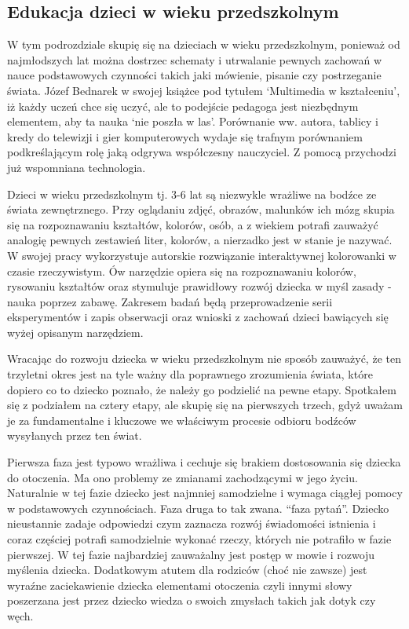 \documentclass{article}
\begin{document}
\subsection{Edukacja dzieci w wieku przedszkolnym}

\par
W tym podrozdziale skupię się na dzieciach w wieku przedszkolnym, ponieważ od najmłodszych lat można dostrzec schematy i utrwalanie pewnych zachowań w nauce podstawowych czynności takich jaki mówienie, pisanie czy postrzeganie świata. Józef Bednarek w swojej książce pod tytułem ‘Multimedia w kształceniu’, iż każdy uczeń chce się uczyć, ale to podejście pedagoga jest niezbędnym elementem, aby ta nauka ‘nie poszła w las’. Porównanie ww. autora, tablicy i kredy do telewizji i gier komputerowych wydaje się trafnym porównaniem podkreślającym rolę jaką odgrywa współczesny nauczyciel. Z pomocą przychodzi już wspomniana technologia. 
\par
Dzieci w wieku przedszkolnym tj. 3-6 lat są niezwykle wrażliwe na bodźce ze świata zewnętrznego. Przy oglądaniu zdjęć, obrazów, malunków ich mózg skupia się na rozpoznawaniu kształtów, kolorów, osób, a z wiekiem potrafi zauważyć analogię pewnych zestawień liter, kolorów, a nierzadko jest w stanie je nazywać. W swojej pracy wykorzystuje autorskie rozwiązanie interaktywnej kolorowanki w czasie rzeczywistym. Ów narzędzie opiera się na rozpoznawaniu kolorów, rysowaniu kształtów oraz stymuluje prawidłowy rozwój dziecka w myśl zasady - nauka poprzez zabawę. Zakresem badań będą przeprowadzenie serii eksperymentów i zapis obserwacji oraz wnioski z zachowań dzieci bawiących się wyżej opisanym narzędziem.
\par
Wracając do rozwoju dziecka w wieku przedszkolnym nie sposób zauważyć, że ten trzyletni okres jest na tyle ważny dla poprawnego zrozumienia świata, które dopiero co to dziecko poznało, że należy go podzielić na pewne etapy. Spotkałem się z podziałem na cztery etapy, ale skupię się na pierwszych trzech, gdyż uważam je za fundamentalne i kluczowe we właściwym procesie odbioru bodźców wysyłanych przez ten świat.
\par
Pierwsza faza jest typowo wrażliwa i cechuje się brakiem dostosowania się dziecka do otoczenia. Ma ono problemy ze zmianami zachodzącymi w jego życiu. Naturalnie w tej fazie dziecko jest najmniej samodzielne i wymaga ciągłej pomocy w podstawowych czynnościach.
Faza druga to tak zwana. “faza pytań”. Dziecko nieustannie zadaje odpowiedzi czym zaznacza rozwój świadomości istnienia i coraz częściej potrafi samodzielnie wykonać rzeczy, których nie potrafiło w fazie pierwszej. W tej fazie najbardziej zauważalny jest postęp w mowie i rozwoju myślenia dziecka. Dodatkowym atutem dla rodziców (choć nie zawsze) jest wyraźne zaciekawienie dziecka elementami otoczenia czyli innymi słowy poszerzana jest przez dziecko wiedza o swoich zmysłach takich jak dotyk czy węch.
\end{document}
